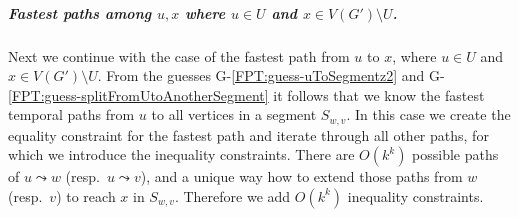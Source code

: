 \documentclass[a4paper,UKenglish,cleveref, autoref, thm-restate]{lipics-v2021}
\begin{document}
\subparagraph{\boldmath Fastest paths among $u,x$ where $u \in U$ and $x \in V(G') \setminus U$.}
Next we continue with the case of the fastest path from $u$ to $x$, where $u \in U$ and $x \in V(G') \setminus U$.
From the guesses G-\ref{FPT:guess-uToSegmentz2} and G-\ref{FPT:guess-splitFromUtoAnotherSegment} it follows that we know the fastest temporal paths from $u$ to all vertices in a segment $S_{w,v}$.
In this case we create the equality constraint for the fastest path and
iterate through all other paths, for which we introduce the inequality constraints.
There are $O(k^k)$ possible paths of $u \leadsto w$ (resp.~$u \leadsto v$),
and a unique way how to extend those paths from $w$ (resp.~$v$) to reach $x$ in $S_{w,v}$.
Therefore we add $O(k^k)$ inequality constraints.

\end{document}
